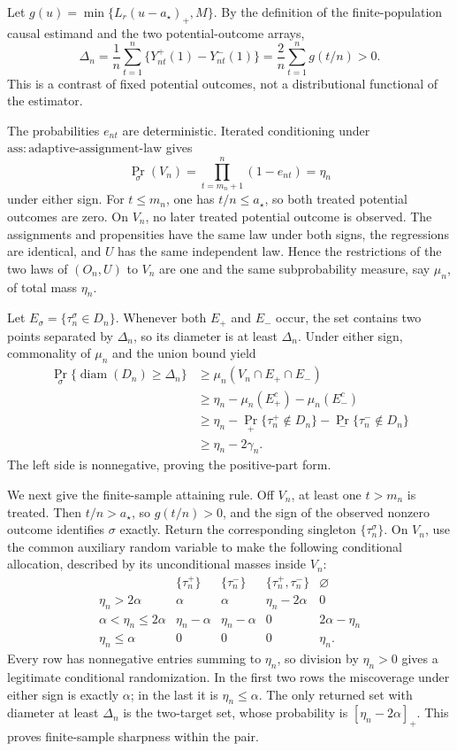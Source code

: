 Let \(g(u)=\min\{L_r(u-a_\star)_+,M\}\). By the definition of the finite-population causal estimand and the two potential-outcome arrays,
\[
 \Delta_n
 =\frac1n\sum_{t=1}^n
   \{Y_{nt}^+(1)-Y_{nt}^-(1)\}
 =\frac2n\sum_{t=1}^n g(t/n)>0.
\]
This is a contrast of fixed potential outcomes, not a distributional functional of the estimator.

The probabilities \(e_{nt}\) are deterministic. Iterated conditioning under \(\mathrm{ass:adaptive\mbox{-}assignment\mbox{-}law}\) gives
\[
 \Pr_\sigma(V_n)
 =\prod_{t=m_n+1}^n(1-e_{nt})
 =\eta_n
\]
under either sign. For \(t\le m_n\), one has \(t/n\le a_\star\), so both treated potential outcomes are zero. On \(V_n\), no later treated potential outcome is observed. The assignments and propensities have the same law under both signs, the regressions are identical, and \(U\) has the same independent law. Hence the restrictions of the two laws of \((O_n,U)\) to \(V_n\) are one and the same subprobability measure, say \(\mu_n\), of total mass \(\eta_n\).

Let \(E_\sigma=\{\tau_n^\sigma\in D_n\}\). Whenever both \(E_+\) and \(E_-\) occur, the set contains two points separated by \(\Delta_n\), so its diameter is at least \(\Delta_n\). Under either sign, commonality of \(\mu_n\) and the union bound yield
\[
 \begin{aligned}
 \Pr_\sigma\{\operatorname{diam}(D_n)\ge\Delta_n\}
 &\ge \mu_n(V_n\cap E_+\cap E_-)\\
 &\ge \eta_n-\mu_n(E_+^c)-\mu_n(E_-^c)\\
 &\ge \eta_n-
   \Pr_+\{\tau_n^+\notin D_n\}
   -\Pr_-\{\tau_n^-\notin D_n\}\\
 &\ge \eta_n-2\gamma_n.
 \end{aligned}
\]
The left side is nonnegative, proving the positive-part form.

We next give the finite-sample attaining rule. Off \(V_n\), at least one \(t>m_n\) is treated. Then \(t/n>a_\star\), so \(g(t/n)>0\), and the sign of the observed nonzero outcome identifies \(\sigma\) exactly. Return the corresponding singleton \(\{\tau_n^\sigma\}\). On \(V_n\), use the common auxiliary random variable to make the following conditional allocation, described by its unconditional masses inside \(V_n\):
\[
\begin{array}{c|cccc}
 &\{\tau_n^+\}&\{\tau_n^-\}&\{\tau_n^+,\tau_n^-\}&\varnothing\\ \hline
\eta_n>2\alpha&\alpha&\alpha&\eta_n-2\alpha&0\\
\alpha<\eta_n\le2\alpha&\eta_n-\alpha&\eta_n-\alpha&0&2\alpha-\eta_n\\
\eta_n\le\alpha&0&0&0&\eta_n.
\end{array}
\]
Every row has nonnegative entries summing to \(\eta_n\), so division by \(\eta_n>0\) gives a legitimate conditional randomization. In the first two rows the miscoverage under either sign is exactly \(\alpha\); in the last it is \(\eta_n\le\alpha\). The only returned set with diameter at least \(\Delta_n\) is the two-target set, whose probability is \([\eta_n-2\alpha]_+\). This proves finite-sample sharpness within the pair.

